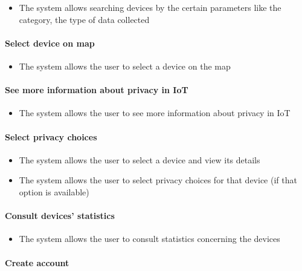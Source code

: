 \begin{itemize}
    \item The system allows searching devices by the certain parameters like the category, the type of data collected
\end{itemize}

\paragraph*{\small Select device on map}

\begin{itemize}
    \item The system allows the user to select a device on the map
\end{itemize}

\paragraph*{\small See more information about privacy in IoT}

\begin{itemize}
    \item The system allows the user to see more information about privacy in IoT
\end{itemize}

\paragraph*{\small Select privacy choices}

\begin{itemize}
    \item The system allows the user to select a device and view its details
    \item The system allows the user to select privacy choices for that device (if that option is available)
\end{itemize}

\paragraph*{\small Consult devices' statistics}

\begin{itemize}
    \item The system allows the user to consult statistics concerning the devices
\end{itemize}

\paragraph*{\small Create account}

